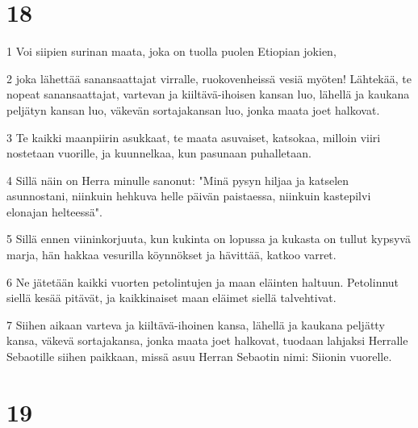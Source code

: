\chapter{18}

\par 1 Voi siipien surinan maata, joka on tuolla puolen Etiopian jokien,
\par 2 joka lähettää sanansaattajat virralle, ruokovenheissä vesiä myöten! Lähtekää, te nopeat sanansaattajat, vartevan ja kiiltävä-ihoisen kansan luo, lähellä ja kaukana peljätyn kansan luo, väkevän sortajakansan luo, jonka maata joet halkovat.
\par 3 Te kaikki maanpiirin asukkaat, te maata asuvaiset, katsokaa, milloin viiri nostetaan vuorille, ja kuunnelkaa, kun pasunaan puhalletaan.
\par 4 Sillä näin on Herra minulle sanonut: "Minä pysyn hiljaa ja katselen asunnostani, niinkuin hehkuva helle päivän paistaessa, niinkuin kastepilvi elonajan helteessä".
\par 5 Sillä ennen viininkorjuuta, kun kukinta on lopussa ja kukasta on tullut kypsyvä marja, hän hakkaa vesurilla köynnökset ja hävittää, katkoo varret.
\par 6 Ne jätetään kaikki vuorten petolintujen ja maan eläinten haltuun. Petolinnut siellä kesää pitävät, ja kaikkinaiset maan eläimet siellä talvehtivat.
\par 7 Siihen aikaan varteva ja kiiltävä-ihoinen kansa, lähellä ja kaukana peljätty kansa, väkevä sortajakansa, jonka maata joet halkovat, tuodaan lahjaksi Herralle Sebaotille siihen paikkaan, missä asuu Herran Sebaotin nimi: Siionin vuorelle.

\chapter{19}

